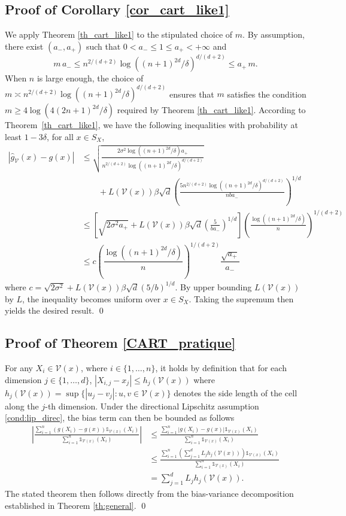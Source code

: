 \documentclass[paper=a4, fontsize=11pt]{scrartcl}
\begin{document}
\subsection*{Proof of Corollary \ref{cor_cart_like1}}
We apply Theorem \ref{th_cart_like1} to the stipulated choice of $m$. By assumption, there exist $(a_-, a_+)$ such that $0 < a_- \leq 1 \leq a_+ < +\infty$ and$$m \, a_- \leq n^{2/(d+2)} \log((n+1)^{2d}/\delta)^{d/(d+2)} \leq a_+ \, m.$$When $n$ is large enough, the choice of $m \asymp n^{2/(d+2)} \log((n+1)^{2d}/\delta)^{d/(d+2)}$ ensures that $m$ satisfies the condition $m \geq 4 \log(4(2n+1)^{2d}/\delta)$ required by Theorem \ref{th_cart_like1}.  According to Theorem~\ref{th_cart_like1}, we have the following inequalities with probability at least $1-3\delta$, for all $x \in S_X$, 
\begin{align*}
| \hat g_{\mathcal V}(x) - g(x)| &\leq \sqrt{\frac{2 \sigma^2 \log((n+1)^{2d}/\delta) a_+}{n^{2/(d+2)} \log((n+1)^{2d}/\delta)^{d/(d+2)}}} \\ &\qquad + L(\mathcal{V}(x)) \beta \sqrt{d} \left( \frac{5 n^{2/(d+2)} \log((n+1)^{2d}/\delta)^{d/(d+2)}}{n b a_-} \right)^{1/d} \\ &\leq \left[ \sqrt{2 \sigma^2 a_+} + L(\mathcal{V}(x))  \beta \sqrt{d} \left( \frac{5}{b a_-} \right)^{1/d} \right] \left( \frac{\log((n+1)^{2d}/\delta)}{n} \right)^{1/(d+2)} \\ &\leq c \left( \dfrac{\log((n+1)^{2d}/\delta)}{n}\right)^{1/(d+2)} \dfrac{\sqrt{a_+}}{a_-}
\end{align*}
where $c = \sqrt{2\sigma^2} + L(\mathcal{V}(x))  \beta  \sqrt{d} (5/b)^{1/d}$. By upper bounding $L(\mathcal{V}(x))$ by $L$, the inequality becomes uniform over $x \in S_X$. Taking the supremum then yields the desired result. \qed



\subsection*{Proof of Theorem \ref{CART_pratique}}
For any $X_i \in \mathcal{V}(x)$, where $i \in \{1, \dots, n\}$, it holds by definition that for each dimension $j \in \{1, \dots, d\}$, $|X_{i,j} - x_j| \leq h_j(\mathcal{V}(x))$ where $h_j(\mathcal{V}(x)) = \sup \{ |u_j - v_j| : u, v \in \mathcal{V}(x) \}$ denotes the side length of the cell along the $j$-th dimension. Under the directional Lipschitz assumption \ref{cond:lip_direc}, the bias term can then be bounded as follows
\begin{align*}\left| \frac{\sum_{i=1}^n (g(X_i) - g(x)) \mathds{1}_{\mathcal{V}(x)}(X_i)}{\sum_{i=1}^n \mathds{1}_{\mathcal{V}(x)}(X_i)} \right| &\leq \frac{\sum_{i=1}^n |g(X_i) - g(x)| \mathds{1}_{\mathcal{V}(x)}(X_i)}{\sum_{i=1}^n \mathds{1}_{\mathcal{V}(x)}(X_i)} \\
&\leq \frac{\sum_{i=1}^n \left( \sum_{j=1}^d L_j h_j(\mathcal{V}(x)) \right) \mathds{1}_{\mathcal{V}(x)}(X_i)}{\sum_{i=1}^n \mathds{1}_{\mathcal{V}(x)}(X_i)} \\
&= \sum_{j=1}^d L_j h_j(\mathcal{V}(x)).\end{align*}
The stated theorem then follows directly from the bias-variance decomposition established in Theorem \ref{th:general}. \qed
\end{document}
